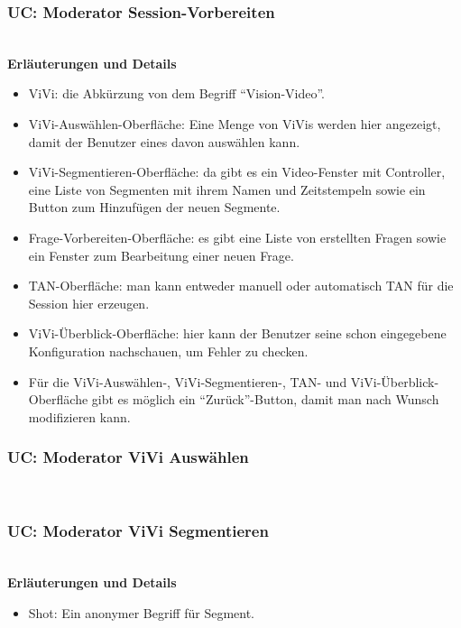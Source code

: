 \subsubsection{UC: Moderator Session-Vorbereiten}

\\[0.5cm]
\textbf{Erläuterungen und Details}
\begin{itemize}
	\item ViVi: die Abkürzung von dem Begriff ``Vision-Video''.
	\item ViVi-Auswählen-Oberfläche: Eine Menge von ViVis werden hier angezeigt, damit der Benutzer eines davon auswählen kann.
	\item ViVi-Segmentieren-Oberfläche: da gibt es ein Video-Fenster mit Controller, eine Liste von Segmenten mit ihrem Namen und Zeitstempeln sowie ein Button zum Hinzufügen der neuen Segmente. 
	\item Frage-Vorbereiten-Oberfläche: es gibt eine Liste von erstellten Fragen
	sowie ein Fenster zum Bearbeitung einer neuen Frage.
	\item TAN-Oberfläche: man kann entweder manuell oder automatisch TAN für die Session hier erzeugen.
	\item ViVi-Überblick-Oberfläche: hier kann der Benutzer seine schon eingegebene Konfiguration nachschauen, um Fehler zu checken.
	\item Für die ViVi-Auswählen-, ViVi-Segmentieren-, TAN- und ViVi-Überblick-Oberfläche gibt es möglich ein ``Zurück''-Button, damit man nach Wunsch modifizieren kann.
\end{itemize}
\pagebreak

\subsubsection{UC: Moderator ViVi Auswählen}

\\[0.5cm]
\pagebreak

\subsubsection{UC: Moderator ViVi Segmentieren}

\\[0.5cm]
\textbf{Erläuterungen und Details}
\begin{itemize}
	\item Shot: Ein anonymer Begriff für Segment.
\end{itemize}
\pagebreak

